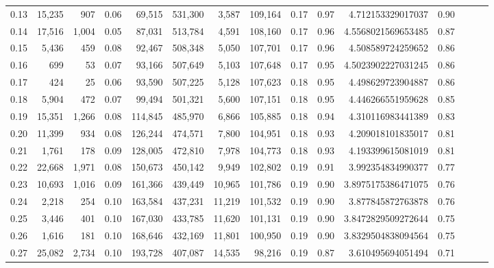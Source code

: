 \begin{tabular}{rrrrrrrrrrrrrrr}
0.13 &  15,235 &     907 &  0.06 &   69,515 &  531,300 &    3,587 &  109,164 &  0.17 &  0.97 &       4.712153329017037 &      0.90 \\
0.14 &  17,516 &   1,004 &  0.05 &   87,031 &  513,784 &    4,591 &  108,160 &  0.17 &  0.96 &      4.5568021569653485 &      0.87 \\
0.15 &   5,436 &     459 &  0.08 &   92,467 &  508,348 &    5,050 &  107,701 &  0.17 &  0.96 &       4.508589724259652 &      0.86 \\
0.16 &     699 &      53 &  0.07 &   93,166 &  507,649 &    5,103 &  107,648 &  0.17 &  0.95 &      4.5023902227031245 &      0.86 \\
0.17 &     424 &      25 &  0.06 &   93,590 &  507,225 &    5,128 &  107,623 &  0.18 &  0.95 &       4.498629723904887 &      0.86 \\
0.18 &   5,904 &     472 &  0.07 &   99,494 &  501,321 &    5,600 &  107,151 &  0.18 &  0.95 &       4.446266551959628 &      0.85 \\
0.19 &  15,351 &   1,266 &  0.08 &  114,845 &  485,970 &    6,866 &  105,885 &  0.18 &  0.94 &       4.310116983441389 &      0.83 \\
0.20 &  11,399 &     934 &  0.08 &  126,244 &  474,571 &    7,800 &  104,951 &  0.18 &  0.93 &       4.209018101835017 &      0.81 \\
0.21 &   1,761 &     178 &  0.09 &  128,005 &  472,810 &    7,978 &  104,773 &  0.18 &  0.93 &       4.193399615081019 &      0.81 \\
0.22 &  22,668 &   1,971 &  0.08 &  150,673 &  450,142 &    9,949 &  102,802 &  0.19 &  0.91 &       3.992354834990377 &      0.77 \\
0.23 &  10,693 &   1,016 &  0.09 &  161,366 &  439,449 &   10,965 &  101,786 &  0.19 &  0.90 &      3.8975175386471075 &      0.76 \\
0.24 &   2,218 &     254 &  0.10 &  163,584 &  437,231 &   11,219 &  101,532 &  0.19 &  0.90 &       3.877845872763878 &      0.76 \\
0.25 &   3,446 &     401 &  0.10 &  167,030 &  433,785 &   11,620 &  101,131 &  0.19 &  0.90 &      3.8472829509272644 &      0.75 \\
0.26 &   1,616 &     181 &  0.10 &  168,646 &  432,169 &   11,801 &  100,950 &  0.19 &  0.90 &      3.8329504838094564 &      0.75 \\
0.27 &  25,082 &   2,734 &  0.10 &  193,728 &  407,087 &   14,535 &   98,216 &  0.19 &  0.87 &       3.610495694051494 &      0.71 \\

\end{tabular}
